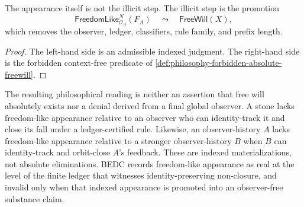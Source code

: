 \begin{corollary}
\label{cor:philosophy-deindexing-illicit-promotion}
The appearance itself is not the illicit step. The illicit step is the
promotion
$$
\mathsf{FreedomLike}^N_{\mathcal O_A}(F_A)
\quad\leadsto\quad
\mathsf{FreeWill}(X),
$$
which removes the observer, ledger, classifiers, rule family, and
prefix length.
\end{corollary}
\begin{proof}
The left-hand side is an admissible indexed judgment. The right-hand
side is the forbidden context-free predicate of
\autoref{def:philosophy-forbidden-absolute-freewill}.
\end{proof}

The resulting philosophical reading is neither an assertion that free
will absolutely exists nor a denial derived from a final global
observer. A stone lacks freedom-like appearance relative to an
observer who can identity-track it and close its fall under a
ledger-certified rule. Likewise, an observer-history $A$ lacks
freedom-like appearance relative to a stronger observer-history $B$
when $B$ can identity-track and orbit-close $A$'s feedback. These are
indexed materializations, not absolute eliminations. BEDC records
freedom-like appearance as real at the level of the finite ledger that
witnesses identity-preserving non-closure, and invalid only when that
indexed appearance is promoted into an observer-free substance claim.

